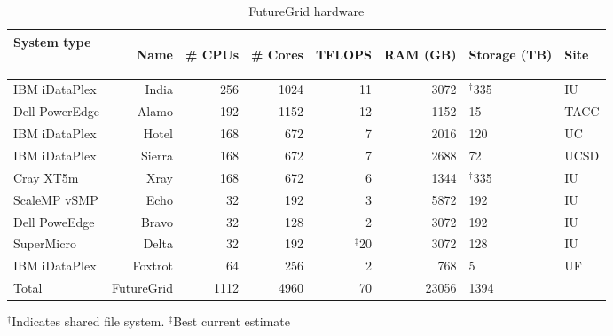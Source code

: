 \begin{table*}
\caption{FutureGrid hardware}\label{T:fg-hardware}
\begin{center}
\begin{tabular}{lrrrrrll}
\hline
System type & 
\begin{sideways}Name \end{sideways}&
\begin{sideways}\# CPUs\end{sideways} & 
\begin{sideways}\# Cores \end{sideways} & 
\begin{sideways}TFLOPS	\end{sideways} & 
\begin{sideways}RAM (GB) \end{sideways} & 
\begin{sideways}Storage (TB) \end{sideways} & 
\begin{sideways} Site \end{sideways} \\
\hline
IBM iDataPlex	& India		& 256	& 1024	& 11	& 3072	& $^{\dagger}$335		& IU \\
\hline
Dell PowerEdge	& Alamo		& 192	& 1152	& 12	& 1152	& 15		        & TACC \\
\hline
IBM iDataPlex	& Hotel 	& 168	& 672	& 7	& 2016	& 120	 	        & UC \\
\hline
IBM iDataPlex	& Sierra	& 168	& 672	& 7	& 2688	& 72		& UCSD \\
\hline
Cray XT5m	& Xray		& 168	& 672	& 6	& 1344	& $^{\dagger}$335		& IU \\
\hline
ScaleMP vSMP	& Echo		& 32	& 192	& 3	& 5872	& 192		& IU \\
\hline
Dell PoweEdge	& Bravo		& 32	& 128	& 2	& 3072	& 192		& IU \\
\hline
SuperMicro	& Delta		& 32	& 192	& $^{\ddagger}$20	& 3072	& 128		& IU \\
\hline
IBM iDataPlex	& Foxtrot 	& 64	& 256	& 2	& 768	& 5 		& UF \\
\hline
\hline
Total	        & FutureGrid	& 1112	& 4960	& 70	& 23056	& 1394           & \\		
\hline
\end{tabular}

$^{\dagger}$Indicates shared file system. $^{\ddagger}$Best current estimate
\end{center}
\end{table*}



